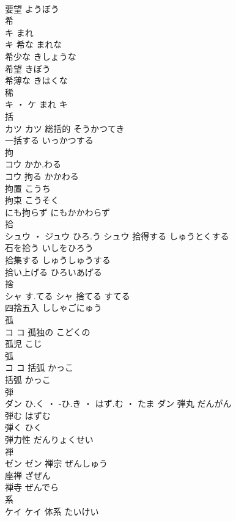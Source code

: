 \documentclass[8pt]{extreport}
\begin{document}
\begin{CJK}{UTF8}{min}
\\	要望	ようぼう	
\\	希	
\\	キ	まれ
\\	キ	希な	まれな	
\\	希少な	きしょうな	
\\	希望	きぼう	
\\	希薄な	きはくな	
\\	稀	
\\	キ ・ ケ	まれ	キ																																			
\\	括	
\\	カツ		カツ	総括的	そうかつてき	
\\	一括する	いっかつする	
\\	拘	
\\	コウ	かか.わる
\\	コウ	拘る	かかわる	
\\	拘置	こうち	
\\	拘束	こうそく	
\\	にも拘らず	にもかかわらず	
\\	拾	
\\	シュウ ・ ジュウ	ひろ.う	シュウ	拾得する	しゅうとくする	
\\	石を拾う	いしをひろう	
\\	拾集する	しゅうしゅうする	
\\	拾い上げる	ひろいあげる	
\\	捨	
\\	シャ	す.てる	シャ	捨てる	すてる	
\\	四捨五入	ししゃごにゅう	
\\	孤	
\\	コ		コ	孤独の	こどくの	
\\	孤児	こじ	
\\	弧	
\\	コ		コ	括弧	かっこ	
\\	括弧	かっこ	
\\	弾	
\\	ダン	ひ.く ・ -ひ.き ・ はず.む ・ たま	ダン	弾丸	だんがん	
\\	弾む	はずむ	
\\	弾く	ひく	
\\	弾力性	だんりょくせい	
\\	禅	
\\	ゼン		ゼン	禅宗	ぜんしゅう	
\\	座禅	ざぜん	
\\	禅寺	ぜんでら	
\\	系	
\\	ケイ		ケイ	体系	たいけい	

\end{CJK}
\end{document}
